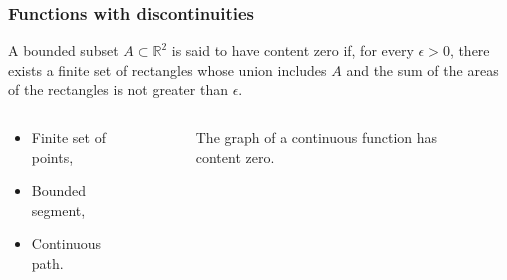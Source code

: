 \documentclass[aspectratio=169,handout]{beamer}
\newcommand{\bR}{\mathbb{R}} %
\begin{document}
\begin{frame}
    \frametitle{Functions with discontinuities}

    \begin{definition}
        A bounded subset \(A\subset \bR^2\) is said to have content zero if, for every \(\epsilon>0\), there exists a finite set of rectangles whose union includes \(A\) and the sum of the areas of the rectangles is not greater than \(\epsilon\).
    \end{definition}



    \begin{columns}
        \begin{column}{.5\textwidth}


            \begin{example}
                \begin{itemize}
                    \item Finite set of points,
                    \item Bounded segment,
                    \item Continuous path.
                \end{itemize}
            \end{example}

        \end{column}
        \begin{column}{.5\textwidth}

            \begin{figure}
                \caption{The graph of a continuous function has content zero.}
            \end{figure}

        \end{column}
    \end{columns}


\end{frame}
\end{document}
